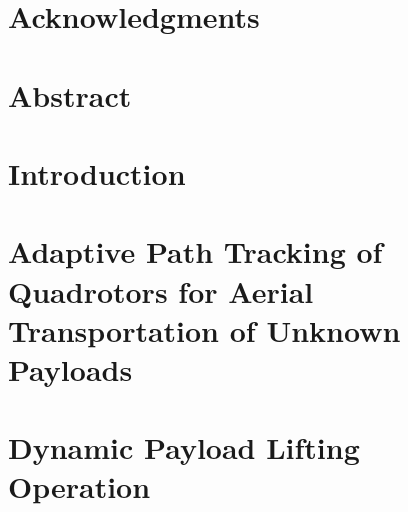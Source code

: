 \documentclass[11pt]{book}
\renewcommand{\baselinestretch}{1.2}
\begin{document}



\newpage
\thispagestyle{empty}
\renewcommand{\thesisdedication}{{\large Copyright \copyright~~VISWA NARAYANAN S., 2021\\}{\large All Rights Reserved\\}}
\thesisdedicationpage



\newpage
\thispagestyle{empty}
\renewcommand{\thesisdedication}{\large To SRM Team Humanoid and the scientific community}
\thesisdedicationpage

\mastersthesis
\renewcommand{\baselinestretch}{1.5}

\chapter*{Acknowledgments}
\label{ch:ack}


\chapter*{Abstract}
\label{ch:abstract}


\tableofcontents
\listoffigures
\listoftables

\chapter{Introduction}
\label{ch:intro}



\chapter{Adaptive Path Tracking of Quadrotors for Aerial Transportation of Unknown Payloads}
\label{ch:asmc}



\chapter{Dynamic Payload Lifting Operation}
\label{ch:switched_mode}

\end{document}

